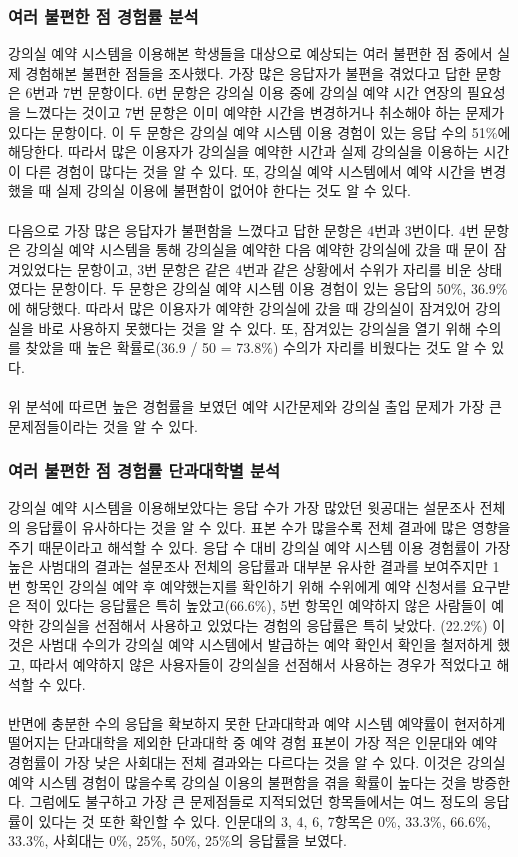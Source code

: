 \documentclass[11pt,a4paper]{article}
\begin{document}
\subsubsection{여러 불편한 점 경험률 분석}
강의실 예약 시스템을 이용해본 학생들을 대상으로 예상되는 여러 불편한 점 중에서 실제 경험해본 불편한 점들을 조사했다. 가장 많은 응답자가 불편을 겪었다고 답한 문항은 6번과 7번 문항이다. 6번 문항은 강의실 이용 중에 강의실 예약 시간 연장의 필요성을 느꼈다는 것이고 7번 문항은 이미 예약한 시간을 변경하거나 취소해야 하는 문제가 있다는 문항이다. 이 두 문항은 강의실 예약 시스템 이용 경험이 있는 응답 수의 51\%에 해당한다. 따라서 많은 이용자가 강의실을 예약한 시간과 실제 강의실을 이용하는 시간이 다른 경험이 많다는 것을 알 수 있다. 또, 강의실 예약 시스템에서 예약 시간을 변경했을 때 실제 강의실 이용에 불편함이 없어야 한다는 것도 알 수 있다.
\\
\\
다음으로 가장 많은 응답자가 불편함을 느꼈다고 답한 문항은 4번과 3번이다. 4번 문항은 강의실 예약 시스템을 통해 강의실을 예약한 다음 예약한 강의실에 갔을 때 문이 잠겨있었다는 문항이고, 3번 문항은 같은 4번과 같은 상황에서 수위가 자리를 비운 상태였다는 문항이다. 두 문항은 강의실 예약 시스템 이용 경험이 있는 응답의 50\%, 36.9\%에 해당했다. 따라서 많은 이용자가 예약한 강의실에 갔을 때 강의실이 잠겨있어 강의실을 바로 사용하지 못했다는 것을 알 수 있다. 또, 잠겨있는 강의실을 열기 위해 수의를 찾았을 때 높은 확률로(36.9 / 50 = 73.8\%) 수의가 자리를 비웠다는 것도 알 수 있다.
\\
\\
위 분석에 따르면 높은 경험률을 보였던 예약 시간문제와 강의실 출입 문제가 가장 큰 문제점들이라는 것을 알 수 있다.

\subsubsection{여러 불편한 점 경험률 단과대학별 분석}
강의실 예약 시스템을 이용해보았다는 응답 수가 가장 많았던 윗공대는 설문조사 전체의 응답률이 유사하다는 것을 알 수 있다. 표본 수가 많을수록 전체 결과에 많은 영향을 주기 때문이라고 해석할 수 있다. 응답 수 대비 강의실 예약 시스템 이용 경험률이 가장 높은 사범대의 결과는 설문조사 전체의 응답률과 대부분 유사한 결과를 보여주지만 1번 항목인 강의실 예약 후 예약했는지를 확인하기 위해 수위에게 예약 신청서를 요구받은 적이 있다는 응답률은 특히 높았고(66.6\%), 5번 항목인 예약하지 않은 사람들이 예약한 강의실을 선점해서 사용하고 있었다는 경험의 응답률은 특히 낮았다. (22.2\%) 이것은 사범대 수의가 강의실 예약 시스템에서 발급하는 예약 확인서 확인을 철저하게 했고, 따라서 예약하지 않은 사용자들이 강의실을 선점해서 사용하는 경우가 적었다고 해석할 수 있다.
\\
\\
반면에 충분한 수의 응답을 확보하지 못한 단과대학과 예약 시스템 예약률이 현저하게 떨어지는 단과대학을 제외한 단과대학 중 예약 경험 표본이 가장 적은 인문대와 예약 경험률이 가장 낮은 사회대는 전체 결과와는 다르다는 것을 알 수 있다. 이것은 강의실 예약 시스템 경험이 많을수록 강의실 이용의 불편함을 겪을 확률이 높다는 것을 방증한다. 그럼에도 불구하고 가장 큰 문제점들로 지적되었던 항목들에서는 여느 정도의 응답률이 있다는 것 또한 확인할 수 있다. 인문대의 3, 4, 6, 7항목은 0\%, 33.3\%, 66.6\%, 33.3\%, 사회대는 0\%, 25\%, 50\%, 25\%의 응답률을 보였다.
\end{document}

